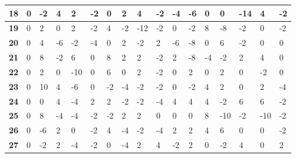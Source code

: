 \begin{longtable}[c]{|l|l|l|l|l|l|l|l|l|l|l|l|l|l|l|l|l|}
\textbf{18} & 0          & -2         & 4          & 2          & -2         & 0          & 2          & 4          & -2         & -4         & -6          & 0           & 0           & -14         & 4           & -2          \\ \hline
\textbf{19} & 0          & 2          & 0          & 2          & -2         & 4          & -2         & -12        & -2         & 0          & -2          & 8           & -8          & -2          & 0           & -2          \\ \hline
\textbf{20} & 0          & 4          & -6         & -2         & -4         & 0          & 2          & -2         & 2          & -6         & -8          & 0           & 6           & -2          & 0           & 0           \\ \hline
\textbf{21} & 0          & 8          & -2         & 6          & 0          & 8          & 2          & 2          & -2         & 2          & -8          & -4          & -2          & 2           & 4           & 0           \\ \hline
\textbf{22} & 0          & 2          & 0          & -10        & 0          & 6          & 0          & 2          & -2         & 0          & 2           & 0           & 2           & 0           & -2          & 0           \\ \hline
\textbf{23} & 0          & 10         & 4          & -6         & 0          & -2         & -4         & -2         & -2         & 0          & -2          & 4           & 2           & 0           & 2           & -4          \\ \hline
\textbf{24} & 0          & 0          & 4          & -4         & 2          & 2          & -2         & -2         & -4         & 4          & 4           & 4           & -2          & 6           & 6           & -2          \\ \hline
\textbf{25} & 0          & 8          & -4         & -4         & -2         & -2         & 2          & 2          & 0          & 0          & 0           & 8           & -10         & -2          & -10         & -2          \\ \hline
\textbf{26} & 0          & -6         & 2          & 0          & -2         & 4          & -4         & -2         & -4         & 2          & 2           & 4           & 6           & 0           & 0           & -2          \\ \hline
\textbf{27} & 0          & -2         & 2          & -4         & -2         & 0          & -4         & 2          & 4          & -2         & 2           & 0           & -2          & 4           & 0           & 2           \\ \hline

\end{longtable}
